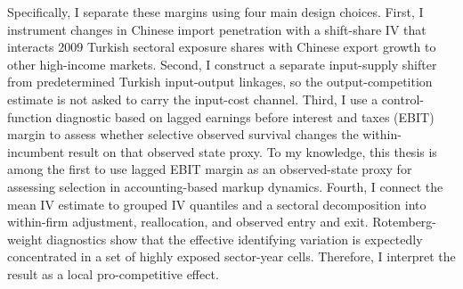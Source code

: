 \documentclass[12pt]{article}
\begin{document}
Specifically, I separate these margins using four main design choices. First, I instrument changes in Chinese import penetration with a shift-share IV that interacts 2009 Turkish sectoral exposure shares with Chinese export growth to other high-income markets. Second, I construct a separate input-supply shifter from predetermined Turkish input-output linkages, so the output-competition estimate is not asked to carry the input-cost channel. Third, I use a control-function diagnostic based on lagged earnings before interest and taxes (EBIT) margin to assess whether selective observed survival changes the within-incumbent result on that observed state proxy. To my knowledge, this thesis is among the first to use lagged EBIT margin as an observed-state proxy for assessing selection in accounting-based markup dynamics. Fourth, I connect the mean IV estimate to grouped IV quantiles and a sectoral decomposition into within-firm adjustment, reallocation, and observed entry and exit. Rotemberg-weight diagnostics show that the effective identifying variation is expectedly concentrated in a set of highly exposed sector-year cells. Therefore, I interpret the result as a local pro-competitive effect.
\end{document}
